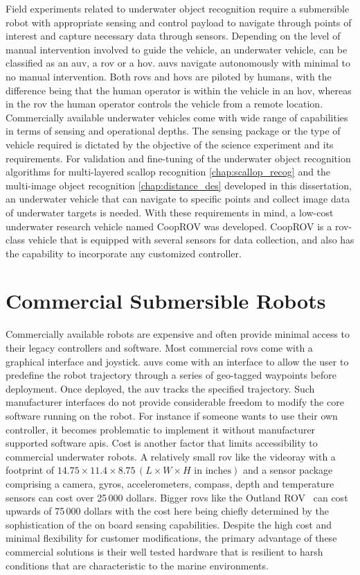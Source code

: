 \documentclass {udthesis}
\begin{document}
Field experiments related to underwater object recognition require a submersible robot with appropriate sensing and control payload to navigate through points of interest and capture necessary data through sensors. Depending on the level of manual intervention involved to guide the vehicle, an underwater vehicle, can be classified as an \gls{auv}, a \gls{rov} or a \gls{hov}. \gls{auv}s navigate autonomously with minimal to no manual intervention. Both \gls{rov}s and \gls{hov}s are piloted by humans, with the difference being that the human operator is within the vehicle in an \gls{hov}, whereas in the \gls{rov} the human operator controls the vehicle from a remote location. Commercially available underwater vehicles come with wide range of capabilities in terms of sensing and operational depths. The sensing package or the type of vehicle required is dictated by the objective of the science experiment and its requirements. For validation and fine-tuning of the underwater object recognition algorithms for 
multi-layered scallop recognition \ref{chap:scallop_recog} and the multi-image object recognition \ref{chap:distance_des} developed in this dissertation, an underwater vehicle that can navigate to specific points and collect image data of underwater targets is needed. With these requirements in mind, a low-cost underwater research vehicle named CoopROV was developed. CoopROV is a \gls{rov}-class vehicle that is equipped with several sensors for data collection, and also has the capability to incorporate any customized controller.

\section{Commercial Submersible Robots}

Commercially available robots are expensive and often provide minimal access to their legacy controllers and software. Most commercial \gls{rov}s come with a graphical interface and joystick. \gls{auv}s come with an interface to allow the user to predefine the robot trajectory through a series of geo-tagged waypoints before deployment. Once deployed, the \gls{auv} tracks the specified trajectory. Such manufacturer interfaces do not provide considerable freedom to modify the core software running on the robot. For instance if someone wants to use their own controller, it becomes problematic to implement it without manufacturer supported software \gls{api}s. Cost is another factor that limits accessibility to commercial underwater robots. A relatively small \gls{rov} like the videoray \cite{videoray} with a footprint of $14.75\times 11.4\times 8.75 \,(L\times W\times H \text{ in inches})$ and a sensor package comprising a camera, gyros, accelerometers, compass, depth and temperature sensors can cost 
over 25\,000 dollars. Bigger \gls{rov}s like the Outland ROV~\cite{outlandrov} can cost upwards of 75\,000 dollars with the cost here being chiefly determined by the sophistication of the on board sensing capabilities. Despite the high cost and minimal flexibility for customer modifications, the primary advantage of these commercial solutions is their well tested hardware that is resilient to harsh conditions that are characteristic to the marine environments.
\end{document}
